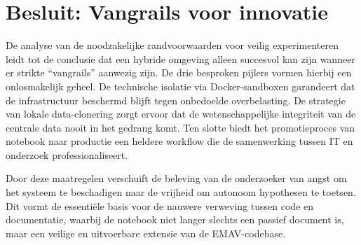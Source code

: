 \section{Besluit: Vangrails voor innovatie}
De analyse van de noodzakelijke randvoorwaarden voor veilig experimenteren leidt tot de conclusie dat een hybride omgeving alleen succesvol kan zijn wanneer er strikte ``vangrails'' aanwezig zijn.
De drie besproken pijlers vormen hierbij een onlosmakelijk geheel. 
De technische isolatie via Docker-sandboxen garandeert dat de infrastructuur beschermd blijft tegen onbedoelde overbelasting. 
De strategie van lokale data-clonering zorgt ervoor dat de wetenschappelijke integriteit van de centrale data nooit in het gedrang komt. 
Ten slotte biedt het promotieproces van notebook naar productie een heldere workflow die de samenwerking tussen IT en onderzoek professionaliseert.

Door deze maatregelen verschuift de beleving van de onderzoeker van angst om het systeem te beschadigen naar de vrijheid om autonoom hypothesen te toetsen. 
Dit vormt de essentiële basis voor de nauwere verweving tussen code en documentatie, waarbij de notebook niet langer slechts een passief document is, maar een veilige en uitvoerbare extensie van de EMAV-codebase.
